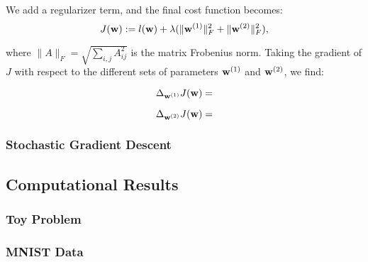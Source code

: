 We add a regularizer term, and the final cost function becomes:
\begin{equation}
J(\boldsymbol{\mathbf{w}}) := l(\boldsymbol{\mathbf{w}}) + \lambda(\|\boldsymbol{\mathbf{w}}^{(1)}\|^2_F + \|\boldsymbol{\mathbf{w}}^{(2)}\|^2_F),
\end{equation}

where $\|A\|_F = \sqrt{\sum_{i,j} A^2_{ij}}$ is the matrix Frobenius norm.  Taking the gradient of $J$ with respect to the different sets of parameters $\boldsymbol{\mathbf{w}}^{(1)}$ and $\boldsymbol{\mathbf{w}}^{(2)}$, we find:  

\begin{equation}
\Delta_{\boldsymbol{\mathbf{w}}^{(1)}} J(\boldsymbol{\mathbf{w}}) = 
\end{equation}

\begin{equation}
\Delta_{\boldsymbol{\mathbf{w}}^{(2)}} J(\boldsymbol{\mathbf{w}}) = 
\end{equation}

\subsubsection{Stochastic Gradient Descent}



\subsection{Computational Results}

\subsubsection{Toy Problem}

\subsubsection{MNIST Data}



